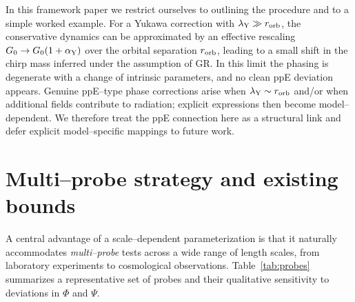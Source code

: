 \documentclass[11pt,a4paper]{article}
\begin{document}
In this framework paper we restrict ourselves to outlining the procedure and to a simple worked example. For a Yukawa correction with $\lambda_{\rm Y}\gg r_{\rm orb}$, the conservative dynamics can be approximated by an effective rescaling $G_0\to G_0(1+\alpha_{\rm Y})$ over the orbital separation $r_{\rm orb}$, leading to a small shift in the chirp mass inferred under the assumption of GR. In this limit the phasing is degenerate with a change of intrinsic parameters, and no clean ppE deviation appears. Genuine ppE--type phase corrections arise when $\lambda_{\rm Y}\sim r_{\rm orb}$ and/or when additional fields contribute to radiation; explicit expressions then become model--dependent. We therefore treat the ppE connection here as a structural link and defer explicit model--specific mappings to future work.

\section{Multi--probe strategy and existing bounds}
\label{sec:multiprobe}

A central advantage of a scale--dependent parameterization is that it naturally accommodates \emph{multi--probe} tests across a wide range of length scales, from laboratory experiments to cosmological observations. Table~\ref{tab:probes} summarizes a representative set of probes and their qualitative sensitivity to deviations in $\Phi$ and $\Psi$.
\end{document}

